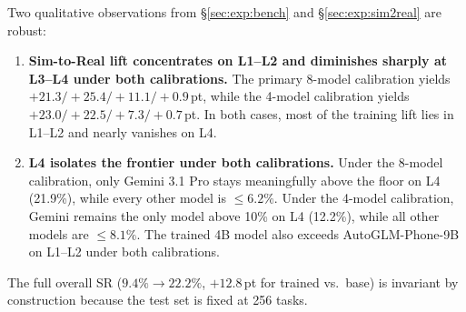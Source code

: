 Two qualitative observations from §\ref{sec:exp:bench} and §\ref{sec:exp:sim2real} are robust:

\begin{enumerate}
\item \textbf{Sim-to-Real lift concentrates on L1--L2 and diminishes sharply at L3--L4 under both calibrations.} The primary 8-model calibration yields $+21.3/+25.4/+11.1/+0.9$\,pt, while the 4-model calibration yields $+23.0/+22.5/+7.3/+0.7$\,pt. In both cases, most of the training lift lies in L1--L2 and nearly vanishes on L4.
\item \textbf{L4 isolates the frontier under both calibrations.} Under the 8-model calibration, only Gemini 3.1 Pro stays meaningfully above the floor on L4 (21.9\%), while every other model is $\leq6.2\%$. Under the 4-model calibration, Gemini remains the only model above 10\% on L4 (12.2\%), while all other models are $\leq8.1\%$. The trained 4B model also exceeds AutoGLM-Phone-9B on L1--L2 under both calibrations.
\end{enumerate}

The full overall SR ($9.4\%\to 22.2\%$, $+12.8$\,pt for trained vs.\ base) is invariant by construction because the test set is fixed at 256 tasks.

